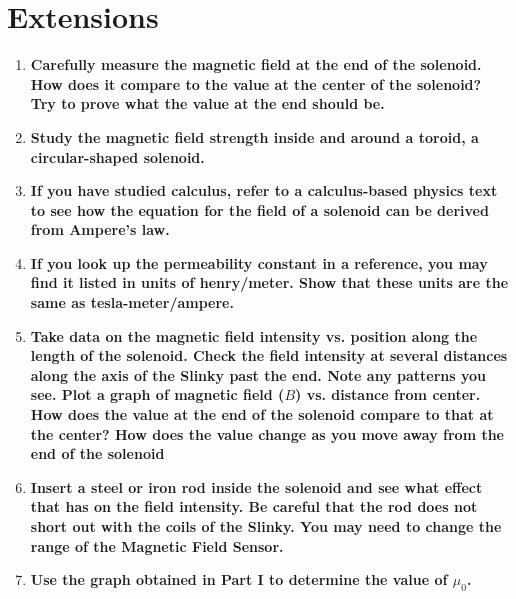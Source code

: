 \documentclass[article, 12pt]{article}
\begin{document}
     \section{Extensions}
     \begin{enumerate}[1.]
      \item \textbf{Carefully measure the magnetic field at the end of the solenoid. How does it compare to the
      value at the center of the solenoid? Try to prove what the value at the end should be.}
      \item \textbf{Study the magnetic field strength inside and around a toroid, a circular-shaped solenoid.}
      \item \textbf{If you have studied calculus, refer to a calculus-based physics text to see how the equation for
      the field of a solenoid can be derived from Ampere's law.}
      \item \textbf{If you look up the permeability constant in a reference, you may find it listed in units
      of henry/meter. Show that these units are the same as tesla-meter/ampere.}
      \item \textbf{Take data on the magnetic field intensity vs. position along the length of the solenoid. Check
      the field intensity at several distances along the axis of the Slinky past the end. Note any
      patterns you see. Plot a graph of magnetic field ($B$) vs. distance from center. How does the
      value at the end of the solenoid compare to that at the center? How does the value change as
      you move away from the end of the solenoid}
      \item \textbf{Insert a steel or iron rod inside the solenoid and see what effect that has on the field intensity.
      Be careful that the rod does not short out with the coils of the Slinky. You may need to
      change the range of the Magnetic Field Sensor.}
      \item \textbf{Use the graph obtained in Part I to determine the value of $\mu_0$.}
     \end{enumerate}
\end{document}
